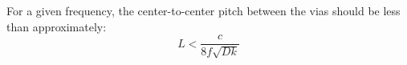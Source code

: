 For a given frequency, the center-to-center pitch between the vias should be less than approximately:
\begin{equation}
    L < \frac{c}{8f\sqrt{Dk}}
\end{equation}